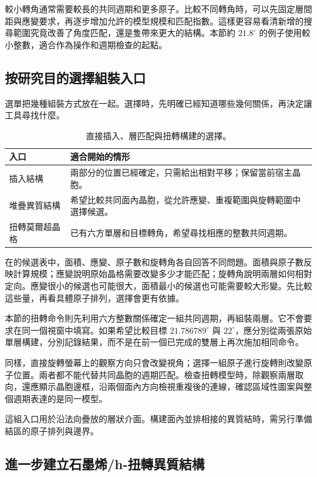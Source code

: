 較小轉角通常需要較長的共同週期和更多原子。比較不同轉角時，可以先固定層間距與應變要求，再逐步增加允許的模型規模和匹配指數。這樣更容易看清新增的搜尋範圍究竟改善了角度匹配，還是隻帶來更大的結構。本節約 $21.8^\circ$ 的例子使用較小整數，適合作為操作和週期檢查的起點。

\subsection{按研究目的選擇組裝入口}

選單把幾種組裝方式放在一起。選擇時，先明確已經知道哪些幾何關係，再決定讓工具尋找什麼。

\begin{table}[htbp]
\centering
\caption{直接插入、層匹配與扭轉構建的選擇。}
\begin{tabularx}{\linewidth}{lX}
\toprule
入口 & 適合開始的情形\\
\midrule
插入結構 & 兩部分的位置已經確定，只需給出相對平移；保留當前宿主晶胞。\\
堆疊異質結構 & 希望比較共同面內晶胞，從允許應變、重複範圍與旋轉範圍中選擇候選。\\
扭轉莫爾超晶格 & 已有六方單層和目標轉角，希望尋找相應的整數共同週期。\\
\bottomrule
\end{tabularx}
\end{table}

在的候選表中，面積、應變、原子數和旋轉角各自回答不同問題。面積與原子數反映計算規模；應變說明原始晶格需要改變多少才能匹配；旋轉角說明兩層如何相對定向。應變很小的候選也可能很大，面積最小的候選也可能需要較大形變。先比較這些量，再看具體原子排列，選擇會更有依據。

本節的扭轉命令則先利用六方整數關係確定一組共同週期，再組裝兩層。它不會要求在同一個視窗中填寫。如果希望比較目標 $21.786789^\circ$ 與 $22^\circ$，應分別從兩張原始單層構建，分別記錄結果，而不是在前一個已完成的雙層上再次施加相同命令。

同樣，直接旋轉螢幕上的觀察方向只會改變視角；選擇一組原子進行旋轉則改變原子位置。兩者都不能代替共同晶胞的週期匹配。檢查扭轉模型時，除觀察兩層取向，還應顯示晶胞邊框，沿兩個面內方向檢視重複後的連線，確認區域性圖案與整個週期表達的是同一模型。

這組入口用於沿法向疊放的層狀介面。構建面內並排相接的異質結時，需另行準備結區的原子排列與邊界。

\subsection{進一步建立石墨烯/h-扭轉異質結構}

